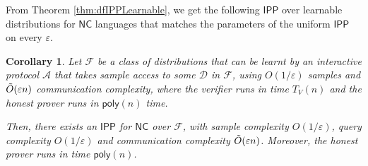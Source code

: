 \documentclass[10pt,a4paper]{article}
\newtheorem{corollary}[theorem]{Corollary}
\newcommand{\poly}{\mathsf{poly}}
\newcommand{\NC}{\mathsf{NC}}
\newcommand{\IPP}{\mathsf{IPP}}
\newcommand{\sD}{\mathcal{D}}
\newcommand{\sF}{\mathcal{F}}
\newcommand{\sA}{\mathcal{A}}
\begin{document}
\noindent From Theorem \ref{thm:dfIPPLearnable}, we get the following $\IPP$ over learnable distributions for $\NC$ languages that matches the parameters of the uniform $\IPP$ on every $\varepsilon$.
\begin{corollary}
\label{cor:learnable_nc_improvement}
Let $\sF$ be a class of distributions that can be learnt by an interactive protocol $\sA$ that takes sample access to some $\sD$ in $\sF$, using $O(1/\varepsilon)$ samples and $\Tilde{O}(\varepsilon n)$ communication complexity, where the verifier runs in time $T_V(n)$ and the honest prover runs in $\poly(n)$ time. 
     
Then, there exists an $\IPP$ for $\NC$ over $\sF$, with sample complexity $O(1/\varepsilon)$, query complexity $O(1/\varepsilon)$ and communication complexity $\Tilde{O}(\varepsilon n)$. Moreover, the honest prover runs in time $\poly(n)$.
\end{corollary}
\end{document}

